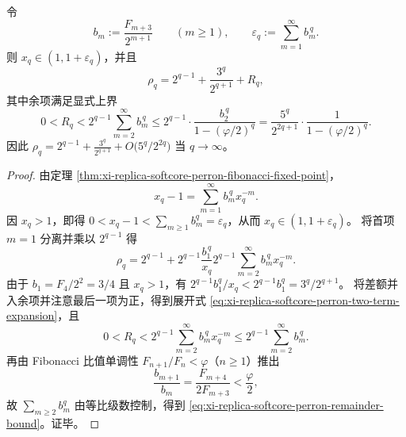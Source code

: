 \begin{corollary}\label{cor:xi-replica-softcore-perron-two-term-expansion}
令
\[
b_m:=\frac{F_{m+3}}{2^{m+1}}\qquad(m\ge 1),
\qquad
\varepsilon_q:=\sum_{m=1}^{\infty}b_m^{\,q}.
\]
则 \(x_q\in(1,1+\varepsilon_q)\)，并且
\begin{equation}\label{eq:xi-replica-softcore-perron-two-term-expansion}
\rho_q
=2^{q-1}+\frac{3^q}{2^{q+1}}+R_q,
\end{equation}
其中余项满足显式上界
\begin{equation}\label{eq:xi-replica-softcore-perron-remainder-bound}
0<R_q
<2^{q-1}\sum_{m=2}^{\infty}b_m^{\,q}
\le 2^{q-1}\cdot \frac{b_2^{\,q}}{1-(\varphi/2)^q}
=\frac{5^q}{2^{2q+1}}\cdot\frac{1}{1-(\varphi/2)^q}.
\end{equation}
因此
\(
\rho_q
=2^{q-1}+\frac{3^q}{2^{q+1}}+O\!\bigl(5^q/2^{2q}\bigr)
\)
当 \(q\to\infty\)。
\end{corollary}
\begin{proof}
由定理 \ref{thm:xi-replica-softcore-perron-fibonacci-fixed-point}，
\[
x_q-1=\sum_{m=1}^{\infty} b_m^{\,q}x_q^{-m}.
\]
因 \(x_q>1\)，即得 \(0<x_q-1<\sum_{m\ge 1}b_m^q=\varepsilon_q\)，从而 \(x_q\in(1,1+\varepsilon_q)\)。
将首项 \(m=1\) 分离并乘以 \(2^{q-1}\) 得
\[
\rho_q
=2^{q-1}+2^{q-1}\frac{b_1^{\,q}}{x_q}
2^{q-1}\sum_{m=2}^{\infty}b_m^{\,q}x_q^{-m}.
\]
由于 \(b_1=F_4/2^2=3/4\) 且 \(x_q>1\)，有
\(
2^{q-1}b_1^q/x_q<2^{q-1}b_1^q=3^q/2^{q+1}
\)。
将差额并入余项并注意最后一项为正，得到展开式 \eqref{eq:xi-replica-softcore-perron-two-term-expansion}，且
\[
0<R_q<2^{q-1}\sum_{m=2}^{\infty}b_m^{\,q}x_q^{-m}\le 2^{q-1}\sum_{m=2}^{\infty}b_m^{\,q}.
\]
再由 Fibonacci 比值单调性 \(F_{n+1}/F_n<\varphi\)（\(n\ge 1\)）推出
\[
\frac{b_{m+1}}{b_m}=\frac{F_{m+4}}{2F_{m+3}}<\frac{\varphi}{2},
\]
故 \(\sum_{m\ge 2}b_m^q\) 由等比级数控制，得到 \eqref{eq:xi-replica-softcore-perron-remainder-bound}。证毕。
\end{proof}

